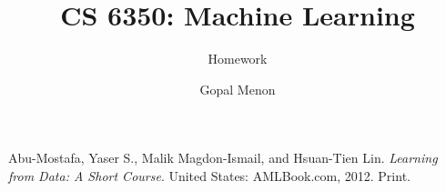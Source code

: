 \documentclass[12pt, fullpage,letterpaper]{article}
\title{CS 6350: Machine Learning \semester}
\author{Homework \assignmentId}
\author{Gopal Menon}
\begin{document}
\maketitle









\begin{thebibliography}{1}
Abu-Mostafa, Yaser S., Malik Magdon-Ismail, and Hsuan-Tien Lin. \textit{Learning from Data: A Short Course}. United States: AMLBook.com, 2012. Print.

\end{thebibliography}
\end{document}
